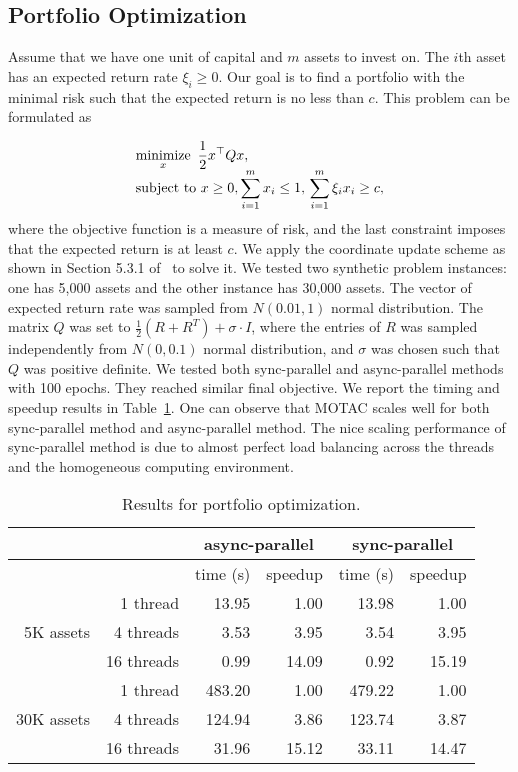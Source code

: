 \subsection{Portfolio Optimization}
Assume that we have one unit of capital and $m$ assets to invest on. The $i$th asset has an expected return rate $\xi_i\ge 0$. Our goal is to find a portfolio with the minimal risk such that the expected return is no less than $c$. This problem can be formulated as

\begin{equation*}
\begin{array}{l}
\displaystyle
\operatorname*{minimize}_x ~ \frac{1}{2} x^\top Q x, \\
\displaystyle
\text{subject to}~ x\ge0, \sum_{i=1}^m x_i\le 1,\, \sum_{i=1}^m\xi_i x_i\ge c,
\end{array}
\end{equation*}
where the objective function is a measure of risk, and the last constraint imposes that the expected return is at least $c$. We apply the coordinate update scheme as shown in Section 5.3.1 of~\citep{PengWuXuYanYin2016_coordinate} to solve it. 
We tested two synthetic  problem instances: one has 5,000 assets and the other instance has 30,000 assets. 
The vector of expected return rate was sampled from $N(0.01, 1)$ normal distribution.
The matrix $Q$ was set to $\frac{1}{2} (R + R^T) + \sigma \cdot I$, where the entries of $R$ was sampled independently from $N(0, 0.1)$ normal distribution, and $\sigma$ was chosen such that $Q$ was positive definite.
We tested both sync-parallel and async-parallel methods with 100 epochs. They reached similar final objective. We report the timing and speedup results in Table~\ref{tab:port_opt}. One can observe that  MOTAC scales well for both sync-parallel method and async-parallel method. The nice scaling performance of sync-parallel method is due to almost perfect load balancing across the threads and the homogeneous computing environment.
\begin{table}[!hb]
\centering
\begin{tabular}{rrrrrr}
\toprule
\multirow{2}{*}{} & &  \multicolumn{2}{c}{async-parallel} & \multicolumn{2}{c}{sync-parallel} \\
\midrule
 & & time (s) & speedup & time (s) & speedup \\
 \midrule
 \multirow{3}{*}{5K assets} & 1 thread & 13.95& 1.00 & 13.98& 1.00 \\
  & 4 threads & 3.53& 3.95 &3.54 & 3.95\\
 & 16 threads & 0.99 &14.09 &0.92 & 15.19\\
\midrule 
 \multirow{3}{*}{30K assets} & 1 thread & 483.20& 1.00& 479.22& 1.00 \\
  & 4 threads & 124.94& 3.86 &123.74 & 3.87\\
 & 16 threads & 31.96 &15.12 &33.11 & 14.47\\ 
\bottomrule
\end{tabular}
 \caption{\label{tab:port_opt}Results for portfolio optimization. }                  
\end{table}

